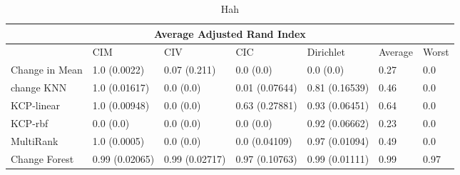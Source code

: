 
\begin{table}[!ht]
\centering
{
\begin{tabular}{ |p{2cm}|p{1.5cm}|p{1.5cm}|p{1.5cm}|p{1.5cm}|p{1.5cm}|p{1.5cm}|}
\hline
\multicolumn{7}{|c|}{Average Adjusted Rand Index} \\
\hline

\hline
 & CIM & CIV & CIC & Dirichlet & Average & Worst  \\
\hline
\hline
Change in Mean & 1.0 (0.0022) & 0.07 (0.211) & 0.0 (0.0) & 0.0 (0.0)& 0.27 & 0.0 \\
change KNN & 1.0 (0.01617) & 0.0 (0.0) & 0.01 (0.07644) & 0.81 (0.16539)& 0.46 & 0.0 \\
KCP-linear & 1.0 (0.00948) & 0.0 (0.0) & 0.63 (0.27881) & 0.93 (0.06451)& 0.64 & 0.0 \\
KCP-rbf & 0.0 (0.0) & 0.0 (0.0) & 0.0 (0.0) & 0.92 (0.06662)& 0.23 & 0.0 \\
MultiRank & 1.0 (0.0005) & 0.0 (0.0) & 0.0 (0.04109) & 0.97 (0.01094)& 0.49 & 0.0 \\
Change Forest & 0.99 (0.02065) & 0.99 (0.02717) & 0.97 (0.10763) & 0.99 (0.01111)& 0.99 & 0.97 \\
\hline
\end{tabular}}
\\
\caption{Hah}
\vspace{10pt}
\label{tab:yourlabel}
\end{table}